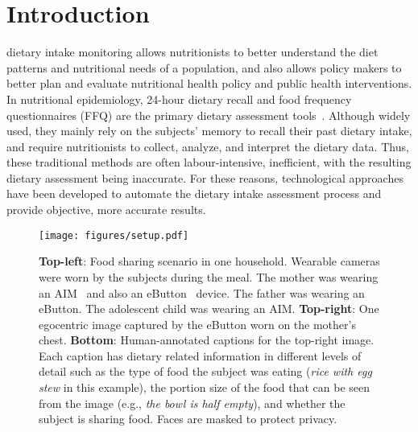 \documentclass[journal]{IEEEtran}
\begin{document}
%
\IEEEpeerreviewmaketitle





\section{Introduction}\label{sec:introduction}




 dietary intake monitoring allows nutritionists to better understand the diet patterns and nutritional needs of a population, and also allows policy makers to better plan and evaluate nutritional health policy and public health interventions. In nutritional epidemiology, 24-hour dietary recall and food frequency questionnaires (FFQ) are the primary dietary assessment tools~\cite{shim2014dietary}. Although widely used, they mainly rely on the subjects' memory to recall their past dietary intake, and require nutritionists to collect, analyze, and interpret the dietary data. Thus, these traditional methods are often labour-intensive, inefficient, with the resulting dietary assessment being inaccurate. For these reasons, technological approaches have been developed to automate the dietary intake assessment process and provide objective, more accurate results.


\begin{figure}[!t]
\centerline{\texttt{[image: figures/setup.pdf]}}
\caption{\textbf{Top-left}: Food sharing scenario in one household. Wearable cameras were worn by the subjects during the meal. The mother was wearing an AIM~\cite{doulah2020automatic} and also an eButton~\cite{sun2015exploratory} device. The father was wearing an eButton. The adolescent child was wearing an AIM. \textbf{Top-right}: One egocentric image captured by the eButton worn on the mother's chest. \textbf{Bottom}: Human-annotated captions for the top-right image. Each caption has dietary related information in different levels of detail such as the type of food the subject was eating (\textit{rice with egg stew} in this example), the portion size of the food that can be seen from the image (e.g., \textit{the bowl is half empty}), and whether the subject is sharing food. Faces are masked to protect privacy.}
\label{fig:setup}

\end{figure}
\end{document}
